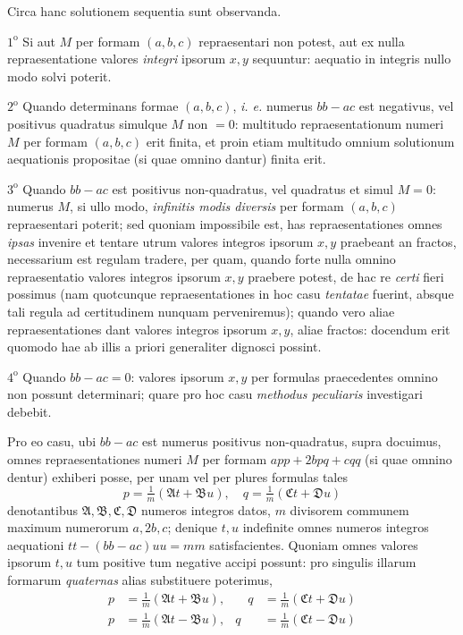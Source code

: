 Circa hanc solutionem sequentia sunt observanda.

$1^{\mathrm{o}}$ Si aut $M$ per formam $(a,b,c)$ repraesentari non potest, aut ex nulla repraesentatione valores \textit{integri} ipsorum $x,y$ sequuntur: aequatio in integris nullo modo solvi poterit.

$2^{\mathrm{o}}$ Quando determinans formae $(a,b,c)$, \textit{i. e.} numerus $bb-ac$ est negativus, vel positivus quadratus simulque $M$ non $=0$: multitudo repraesentationum numeri $M$ per formam $(a,b,c)$ erit finita, et proin etiam multitudo omnium solutionum aequationis propositae (si quae omnino dantur) finita erit.

$3^{\mathrm{o}}$ Quando $bb-ac$ est positivus non-quadratus, vel quadratus et simul $M=0$: numerus $M$, si ullo modo, \textit{infinitis modis diversis} per formam $(a,b,c)$ repraesentari poterit; sed quoniam impossibile est, has repraesentationes omnes \textit{ipsas} invenire et tentare utrum valores integros ipsorum $x,y$ praebeant an fractos, necessarium est regulam tradere, per quam, quando forte nulla omnino repraesentatio valores integros ipsorum $x,y$ praebere potest, de hac re \textit{certi} fieri possimus (nam quotcunque repraesentationes in hoc casu \textit{tentatae} fuerint, absque tali regula ad certitudinem nunquam perveniremus); quando vero aliae repraesentationes dant valores integros ipsorum $x,y$, aliae fractos: docendum erit quomodo hae ab illis a priori generaliter dignosci possint.

$4^{\mathrm{o}}$ Quando $bb-ac=0$: valores ipsorum $x,y$ per formulas praecedentes omnino non possunt determinari; quare pro hoc casu \textit{methodus peculiaris} investigari debebit.

Pro eo casu, ubi $bb-ac$ est numerus positivus non-quadratus, supra docuimus, omnes repraesentationes numeri $M$ per formam $app+2bpq+cqq$ (si quae omnino dentur) exhiberi posse, per unam vel per plures formulas tales
\[
p=\tfrac{1}{m}(\mathfrak{A}t+\mathfrak{B}u),\quad q=\tfrac{1}{m}(\mathfrak{C}t+\mathfrak{D}u)
\]
denotantibus $\mathfrak{A},\mathfrak{B},\mathfrak{C},\mathfrak{D}$ numeros integros datos, $m$ divisorem communem maximum numerorum $a,2b,c$; denique $t,u$ indefinite omnes numeros integros aequationi $tt-(bb-ac)uu=mm$ satisfacientes. Quoniam omnes valores ipsorum $t,u$ tum positive tum negative accipi possunt: pro singulis illarum formarum \textit{quaternas} alias substituere poterimus,
\[
\begin{aligned}
p&=\tfrac{1}{m}(\mathfrak{A}t+\mathfrak{B}u), &\quad q&=\tfrac{1}{m}(\mathfrak{C}t+\mathfrak{D}u)\\
p&=\tfrac{1}{m}(\mathfrak{A}t-\mathfrak{B}u), &q&=\tfrac{1}{m}(\mathfrak{C}t-\mathfrak{D}u)
\end{aligned}
\]
